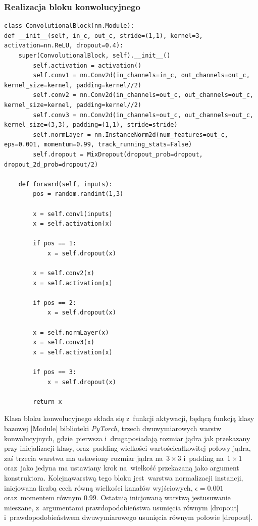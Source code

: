\subsubsection{Realizacja bloku konwolucyjnego} \label{ConvBlock}
\begin{lstlisting}[caption={\pyth|ConvolutionalBlock| - klasa bloku konwolucyjnego.}, label={convblock}]
class ConvolutionalBlock(nn.Module):
def __init__(self, in_c, out_c, stride=(1,1), kernel=3, activation=nn.ReLU, dropout=0.4):
	super(ConvolutionalBlock, self).__init__()
		self.activation = activation()
		self.conv1 = nn.Conv2d(in_channels=in_c, out_channels=out_c, kernel_size=kernel, padding=kernel//2)
		self.conv2 = nn.Conv2d(in_channels=out_c, out_channels=out_c, kernel_size=kernel, padding=kernel//2)
		self.conv3 = nn.Conv2d(in_channels=out_c, out_channels=out_c, kernel_size=(3,3), padding=(1,1), stride=stride)
		self.normLayer = nn.InstanceNorm2d(num_features=out_c, eps=0.001, momentum=0.99, track_running_stats=False)
		self.dropout = MixDropout(dropout_prob=dropout, dropout_2d_prob=dropout/2)
	
	def forward(self, inputs):
		pos = random.randint(1,3)
		
		x = self.conv1(inputs)
		x = self.activation(x)
		
		if pos == 1:
			x = self.dropout(x)
		
		x = self.conv2(x)
		x = self.activation(x)
		
		if pos == 2:
			x = self.dropout(x)
		
		x = self.normLayer(x)
		x = self.conv3(x)
		x = self.activation(x)
		
		if pos == 3:
			x = self.dropout(x)
		
		return x
\end{lstlisting}

Klasa bloku konwolucyjnego składa się z~funkcji aktywacji, będącą funkcją klasy bazowej \pyth|Module| biblioteki \textit{PyTorch}, trzech dwuwymiarowych warstw konwolucyjnych, gdzie~pierwsza i~druga\linebreak posiadają rozmiar jądra jak przekazany przy inicjalizacji klasy, oraz~padding wielkości wartości\linebreak całkowitej połowy jądra, zaś trzecia warstwa ma ustawiony rozmiar jądra na~$3\times 3$ i~padding na~$1 \times 1$ oraz~jako jedyna ma ustawiany krok na~wielkość przekazaną jako argument konstruktora. Kolejną\linebreak warstwą tego bloku jest~warstwa normalizacji instancji, inicjowana liczbą cech równą wielkości kanałów wyjściowych, $\epsilon = 0.001$ oraz~momentem równym $0.99$. Ostatnią inicjowaną warstwą jest\linebreak usuwanie mieszane, z~argumentami prawdopodobieństwa usunięcia równym \pyth|dropout| i~prawdopodobieństwem dwuwymiarowego usunięcia równym połowie \pyth|dropout|.

